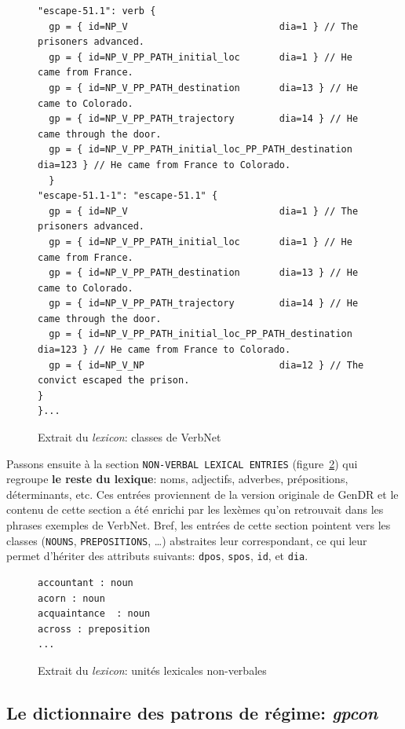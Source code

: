 \begin{figure}[htb]
  \caption{Extrait du \emph{lexicon}: classes de VerbNet}
	\label{fig:vnclass}
\begin{lstlisting}[language=mate]
"escape-51.1": verb {
  gp = { id=NP_V                           dia=1 } // The prisoners advanced.
  gp = { id=NP_V_PP_PATH_initial_loc       dia=1 } // He came from France.
  gp = { id=NP_V_PP_PATH_destination       dia=13 } // He came to Colorado.
  gp = { id=NP_V_PP_PATH_trajectory        dia=14 } // He came through the door.
  gp = { id=NP_V_PP_PATH_initial_loc_PP_PATH_destination dia=123 } // He came from France to Colorado.
  }
"escape-51.1-1": "escape-51.1" {
  gp = { id=NP_V                           dia=1 } // The prisoners advanced.
  gp = { id=NP_V_PP_PATH_initial_loc       dia=1 } // He came from France.
  gp = { id=NP_V_PP_PATH_destination       dia=13 } // He came to Colorado.
  gp = { id=NP_V_PP_PATH_trajectory        dia=14 } // He came through the door.
  gp = { id=NP_V_PP_PATH_initial_loc_PP_PATH_destination dia=123 } // He came from France to Colorado.
  gp = { id=NP_V_NP                        dia=12 } // The convict escaped the prison.
}
}...
\end{lstlisting}
\end{figure}

Passons ensuite à la section \texttt{NON-VERBAL LEXICAL ENTRIES} (figure~\ref{fig:unitenonverbale}) qui regroupe \textbf{le reste du lexique}: noms, adjectifs, adverbes, prépositions, déterminants, etc. Ces entrées proviennent de la version originale de GenDR \citep{lareau18} et le contenu de cette section a été enrichi par les lexèmes qu'on retrouvait dans les phrases exemples de VerbNet. Bref, les entrées de cette section pointent vers les classes (\texttt{NOUNS}, \texttt{PREPOSITIONS}, \ldots) abstraites leur correspondant, ce qui leur permet d'hériter des attributs suivants: \texttt{dpos}, \texttt{spos}, \texttt{id}, et \texttt{dia}.

\begin{figure}[htb]
  \caption{Extrait du \emph{lexicon}: unités lexicales non-verbales}
	\label{fig:unitenonverbale}
\begin{lstlisting}[language=mate]
accountant : noun
acorn : noun
acquaintance  : noun
across : preposition
...
\end{lstlisting}
\end{figure}

\subsection{Le dictionnaire des patrons de régime: \emph{gpcon}}

